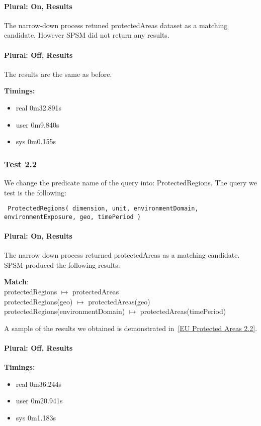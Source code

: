 \documentclass[a4paper,10pt]{article}
\begin{document}
\paragraph{Plural: On, Results} The narrow-down process retuned protectedAreas dataset as a matching candidate. However SPSM did not return any results.
\paragraph{Plural: Off, Results} The results are the same as before.

\textbf{Timings:}
\begin{itemize}
\item real	0m32.891s
\item user	0m9.840s
\item sys	0m0.155s

\end{itemize}


\subsubsection{Test 2.2}
We change the predicate name of the query into: ProtectedRegions. The query we test is the following: 

\indent \texttt{ ProtectedRegions( dimension, unit, environmentDomain,  environmentExposure, geo, timePeriod )}


\paragraph{Plural: On, Results}
The narrow down process returned protectedAreas as a matching candidate. SPSM produced the following results: 

\textbf{Match}:\\
protectedRegions $\mapsto$ protectedAreas \\
protectedRegions(geo) $\mapsto$ protectedAreas(geo)\\
protectedRegions(environmentDomain) $\mapsto$ protectedAreas(timePeriod)

A sample of the results we obtained is demonstrated in~\ref{EU Protected Areas 2.2}.
\paragraph{Plural: Off, Results}

\textbf{Timings:}
\begin{itemize}
\item real	0m36.244s
\item user	0m20.941s
\item sys	0m1.183s
\end{itemize}
\end{document}
